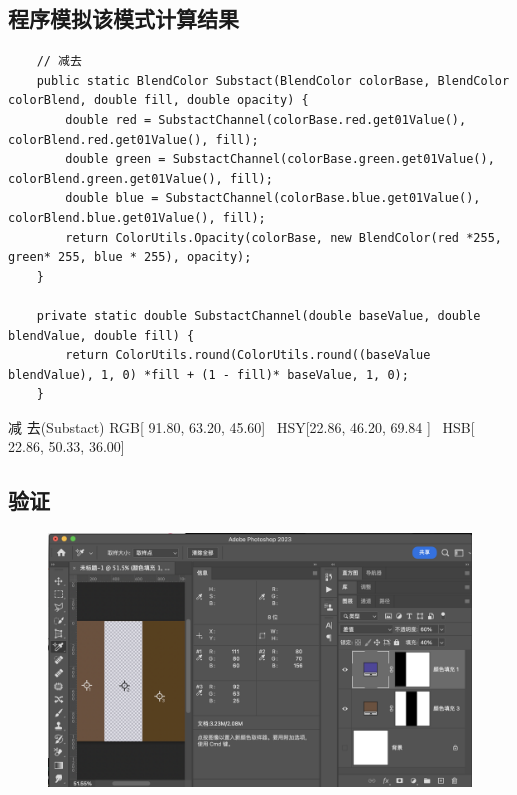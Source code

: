 \newpage
\subsection{ 程序模拟该模式计算结果}

\begin{lstlisting}
	// 减去
	public static BlendColor Substact(BlendColor colorBase, BlendColor colorBlend, double fill, double opacity) {
		double red = SubstactChannel(colorBase.red.get01Value(), colorBlend.red.get01Value(), fill);
		double green = SubstactChannel(colorBase.green.get01Value(), colorBlend.green.get01Value(), fill);
		double blue = SubstactChannel(colorBase.blue.get01Value(), colorBlend.blue.get01Value(), fill);
		return ColorUtils.Opacity(colorBase, new BlendColor(red *255, green* 255, blue * 255), opacity);
	}
	
	private static double SubstactChannel(double baseValue, double blendValue, double fill) {
		return ColorUtils.round(ColorUtils.round((baseValue  blendValue), 1, 0) *fill + (1 - fill)* baseValue, 1, 0);
	}
\end{lstlisting}


\begin{result}
\item 	减    去(Substact)      RGB[ 91.80,  63.20,  45.60]~ HSY[22.86,  46.20,  69.84 ]~ HSB[ 22.86,  50.33,  36.00]
\end{result}



\subsection{ 验证}
\begin{figure}[h!]
	\centering
	\includegraphics[width=\linewidth]{figure/substract}
	\caption{}
	\label{fig:substract}
\end{figure}

